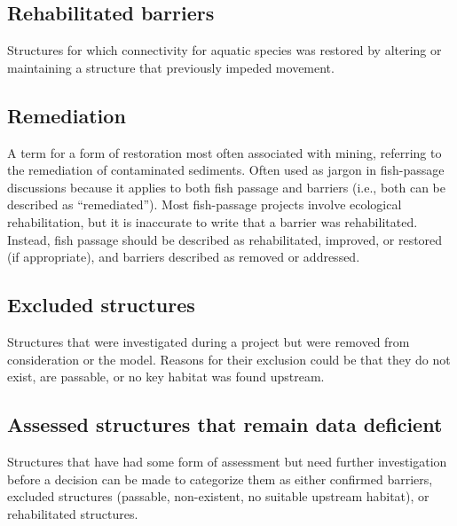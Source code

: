 \documentclass[
  letterpaper,
  DIV=11,
  numbers=noendperiod]{scrreprt}
\begin{document}
\hypertarget{rehabilitated-barriers}{%
\subsection*{Rehabilitated barriers}\label{rehabilitated-barriers}}

Structures for which connectivity for aquatic species was restored by
altering or maintaining a structure that previously impeded movement.

\hypertarget{remediation}{%
\subsection*{Remediation}\label{remediation}}

A term for a form of restoration most often associated with mining,
referring to the remediation of contaminated sediments. Often used as
jargon in fish-passage discussions because it applies to both fish
passage and barriers (i.e., both can be described as ``remediated'').
Most fish-passage projects involve ecological rehabilitation, but it is
inaccurate to write that a barrier was rehabilitated. Instead, fish
passage should be described as rehabilitated, improved, or restored (if
appropriate), and barriers described as removed or addressed.

\hypertarget{excluded-structures}{%
\subsection*{Excluded structures}\label{excluded-structures}}

Structures that were investigated during a project but were removed from
consideration or the model. Reasons for their exclusion could be that
they do not exist, are passable, or no key habitat was found upstream.

\hypertarget{assessed-structures-that-remain-data-deficient}{%
\subsection*{Assessed structures that remain data
deficient}\label{assessed-structures-that-remain-data-deficient}}

Structures that have had some form of assessment but need further
investigation before a decision can be made to categorize them as either
confirmed barriers, excluded structures (passable, non-existent, no
suitable upstream habitat), or rehabilitated structures.
\end{document}
